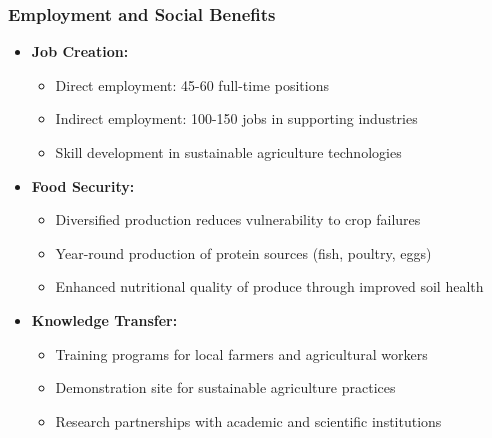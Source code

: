 \subsubsection{Employment and Social Benefits}
\begin{itemize}
    \item \textbf{Job Creation:}
    \begin{itemize}
        \item Direct employment: 45-60 full-time positions
        \item Indirect employment: 100-150 jobs in supporting industries
        \item Skill development in sustainable agriculture technologies
    \end{itemize}
    
    \item \textbf{Food Security:}
    \begin{itemize}
        \item Diversified production reduces vulnerability to crop failures
        \item Year-round production of protein sources (fish, poultry, eggs)
        \item Enhanced nutritional quality of produce through improved soil health
    \end{itemize}
    
    \item \textbf{Knowledge Transfer:}
    \begin{itemize}
        \item Training programs for local farmers and agricultural workers
        \item Demonstration site for sustainable agriculture practices
        \item Research partnerships with academic and scientific institutions
    \end{itemize}
\end{itemize}

